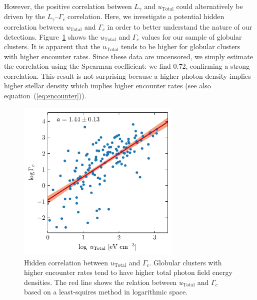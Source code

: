 \documentclass[doublespace,nopageskip]{VTthesis}
\begin{document}
However, the positive correlation between $L_\gamma$ and $u_\mathrm{Total}$ could alternatively be driven by the $L_\gamma$--$\Gamma_c$ correlation. Here, we investigate a potential hidden correlation between $u_\mathrm{Total}$ and $\Gamma_c$ in order to better understand the nature of our detections. Figure~\ref{fig:hidden_0} shows the $u_\mathrm{Total}$ and $\Gamma_c$ values for our sample of globular clusters. It is apparent that the $u_\mathrm{Total}$ tends to be higher for globular clusters with higher encounter rates. Since these data are uncensored, we simply estimate the correlation using the Spearman coefficient: we find 0.72, confirming a strong correlation. This result is not surprising because a higher photon density implies higher stellar density which implies higher encounter rates (see also equation~(\ref{eq:encounter})).

\begin{figure}[htb]
    \centering
    \includegraphics[width=0.7\textwidth]{Figures/Globular/hidden.pdf}
    \caption{Hidden correlation between $u_\mathrm{Total}$ and $\Gamma_c$. Globular clusters with higher encounter rates tend to have higher total photon field energy densities. The red line shows the relation between $u_\mathrm{Total}$ and $\Gamma_c$ based on a least-squires method in logarithmic space.}
    \label{fig:hidden_0}
\end{figure}
\end{document}

